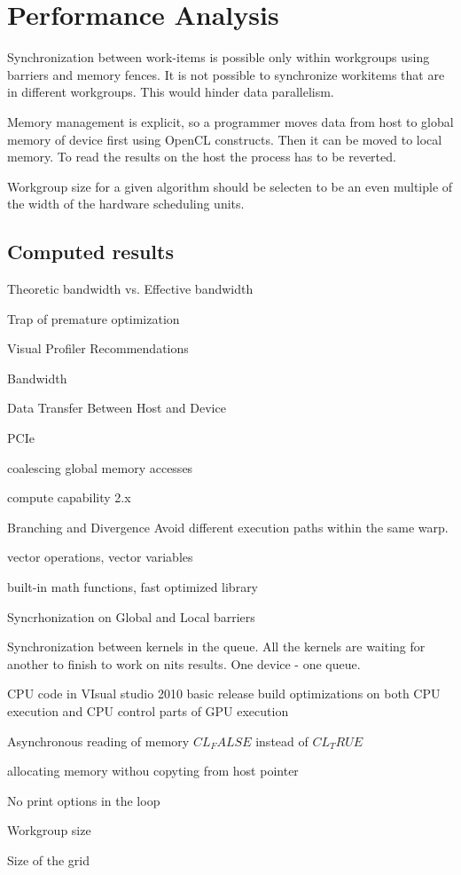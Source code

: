 \chapter{Performance Analysis}

Synchronization between work-items is possible only within workgroups using barriers and memory fences. It is not possible to synchronize workitems that are in different workgroups. This would hinder data parallelism.

Memory management is explicit, so a programmer moves data from host to global memory of device first using OpenCL constructs. Then it can be moved to local memory. To read the results on the host the process has to be reverted.

Workgroup size for a given algorithm should be selecten to be an even multiple of the width of the hardware scheduling units.

\section{Computed results}
Theoretic bandwidth vs. Effective bandwidth

Trap of premature optimization

Visual Profiler Recommendations

Bandwidth

Data Transfer Between Host and Device

PCIe

coalescing global memory accesses

compute capability 2.x

Branching and Divergence
Avoid different execution paths within the same warp.

vector operations, vector variables

built-in math functions, fast optimized library

Syncrhonization on Global and Local barriers

Synchronization between kernels in the queue. All the kernels are waiting for another to finish to work on nits results.
One device - one queue.

CPU code in VIsual studio 2010 basic release build optimizations on both CPU execution and CPU control parts of GPU execution

Asynchronous reading of memory $CL_FALSE$ instead of $CL_TRUE$

allocating memory withou copyting from host pointer

No print options in the loop

Workgroup size

Size of the grid

